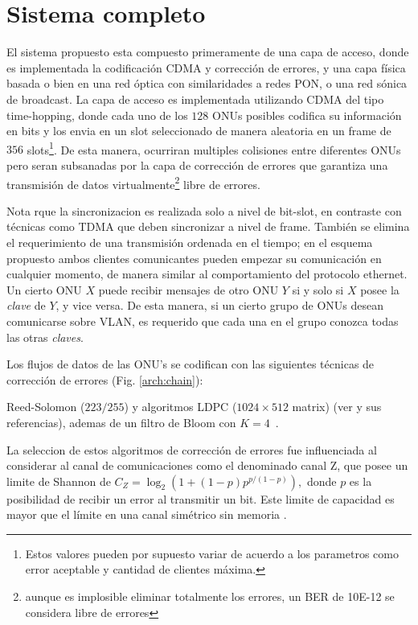 \section{Sistema completo}
El sistema propuesto esta compuesto primeramente de una capa de acceso, donde es implementada la codificación CDMA y corrección de errores, y una capa física basada o bien en una red óptica con similaridades a redes PON, o una red sónica de broadcast.
La capa de acceso es implementada utilizando CDMA del tipo time-hopping, donde cada uno de los $128$ ONUs posibles codifica su información en bits y los envia en un slot seleccionado de manera aleatoria en un frame de $356$ slots\footnote{ Estos valores pueden por supuesto variar de acuerdo a los parametros como error aceptable y cantidad de clientes máxima.}. De esta manera, ocurriran multiples colisiones entre diferentes ONUs pero seran subsanadas por la capa de corrección de errores que garantiza una transmisión de datos virtualmente\footnote{aunque es implosible eliminar totalmente los errores, un BER de 10E-12 se considera libre de errores} libre de errores.

Nota rque la sincronizacion es realizada solo a nivel de bit-slot, en contraste con técnicas como TDMA que deben sincronizar a nivel de frame. También se elimina el requerimiento de una transmisión ordenada en el tiempo; en el esquema propuesto ambos clientes comunicantes pueden empezar su comunicación en cualquier momento, de manera similar al comportamiento del protocolo ethernet.
Un cierto ONU $X$ puede recibir mensajes de otro ONU $Y$ si y solo si $X$ posee la {\em clave} de $Y$, y vice versa. De esta manera, si un cierto grupo de ONUs desean comunicarse sobre VLAN, es requerido que cada una en el grupo conozca todas las otras {\em claves}.

Los flujos de datos de las ONU's se codifican con las siguientes técnicas de corrección de errores (Fig. \ref{arch:chain}):

Reed-Solomon ($223/255$) y algoritmos LDPC ($1024\times512$ matrix) (ver \cite{Moon:05} y sus referencias), ademas de un filtro de Bloom con $K=4$~\cite{Bloom70space/timetrade-offs}.

La seleccion de estos algoritmos de corrección de errores fue influenciada al considerar al canal de comunicaciones como el denominado canal Z, que posee un limite de Shannon de $ C_{Z} = \log_2\left(1+(1-p) p^{p/(1-p)}\right),$ donde $p$ es la posibilidad de recibir un error al transmitir un bit.
Este limite de capacidad es mayor que el límite en una canal simétrico sin memoria \cite{Tallini:02}.

